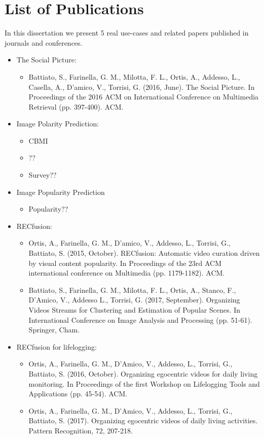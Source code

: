\section{List of Publications}
In this dissertation we present 5 real use-cases and related papers published in journals and conferences.
\begin{itemize}
	
	\item The Social Picture:
	\begin{itemize}
		\item Battiato, S., Farinella, G. M., Milotta, F. L., Ortis, A., Addesso, L., Casella, A.,  D'amico, V., Torrisi, G. (2016, June). The Social Picture. In Proceedings of the 2016 ACM on International Conference on Multimedia Retrieval (pp. 397-400). ACM.	
	\end{itemize}	 

	\item Image Polarity Prediction:
	\begin{itemize}
		\item CBMI
		\item ??
		\item Survey??
	\end{itemize}
	
	\item Image Popularity Prediction
	\begin{itemize}
		\item Popularity??
	\end{itemize}
	
	\item 	RECfusion:
	\begin{itemize}
		\item Ortis, A., Farinella, G. M., D'amico, V., Addesso, L., Torrisi, G., Battiato, S. (2015, October). RECfusion: Automatic video curation driven by visual content popularity. In Proceedings of the 23rd ACM international conference on Multimedia (pp. 1179-1182). ACM.
		\item Battiato, S., Farinella, G. M., Milotta, F. L., Ortis, A., Stanco, F., D’Amico, V., Addesso L., Torrisi, G. (2017, September). Organizing Videos Streams for Clustering and Estimation of Popular Scenes. In International Conference on Image Analysis and Processing (pp. 51-61). Springer, Cham.		
	\end{itemize}	
	
	\item RECfusion for lifelogging:
	\begin{itemize}
		\item Ortis, A., Farinella, G. M., D'Amico, V., Addesso, L., Torrisi, G.,  Battiato, S. (2016, October). Organizing egocentric videos for daily living monitoring. In Proceedings of the first Workshop on Lifelogging Tools and Applications (pp. 45-54). ACM.
		\item Ortis, A., Farinella, G. M., D’Amico, V., Addesso, L., Torrisi, G., Battiato, S. (2017). Organizing egocentric videos of daily living activities. Pattern Recognition, 72, 207-218.
	\end{itemize}
	
\end{itemize}